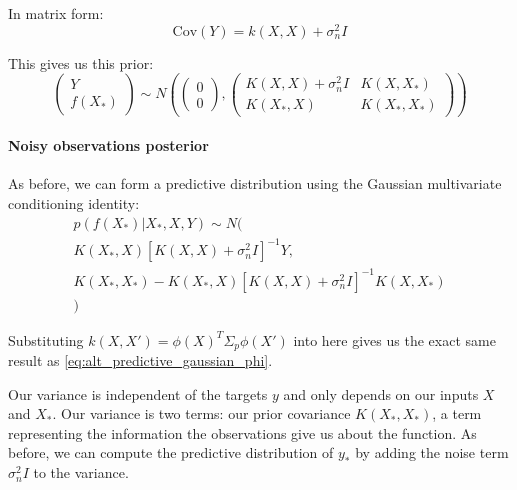In matrix form:
\begin{equation*}
    \text{Cov}(Y) = k(X,X) + \sigma^2_nI
\end{equation*}
    
This gives us this prior:
\begin{equation} \label{eq:joint_prior_noisy}
    \begin{pmatrix}
        Y \\ f(X_*)
    \end{pmatrix} \sim N\left(
    \begin{pmatrix}
        0 \\ 0
    \end{pmatrix},
    \begin{pmatrix}
        K(X,X) + \sigma^2_nI & K(X,X_*) \\ K(X_*,X) & K(X_*,X_*)
    \end{pmatrix}
    \right)
\end{equation}

\paragraph{Noisy observations posterior}
As before, we can form a predictive distribution using the Gaussian multivariate conditioning identity:
\begin{equation} \label{eq:predictive_distribution_noisy}
    \begin{aligned}
        p(f(X_*)|X_*, X, Y) \sim N( \\
        K(X_*,X)[K(X,X) + \sigma^2_nI]^{-1}Y, \\
        K(X_*,X_*) - K(X_*,X)[K(X,X) + \sigma^2_nI]^{-1}K(X,X_*) \\
        )
    \end{aligned}
\end{equation}

Substituting $k(X,X') = \phi(X)^T\Sigma_p\phi(X')$ into here gives us the exact same result as \ref{eq:alt_predictive_gaussian_phi}.

Our variance is independent of the targets $y$ and only depends on our inputs $X$ and $X_*$. Our variance is two terms: our prior covariance $K(X_*,X_*)$, a term representing the information the observations give us about the function. As before, we can compute the predictive distribution of $y_*$ by adding the noise term $\sigma^2_nI$ to the variance.

